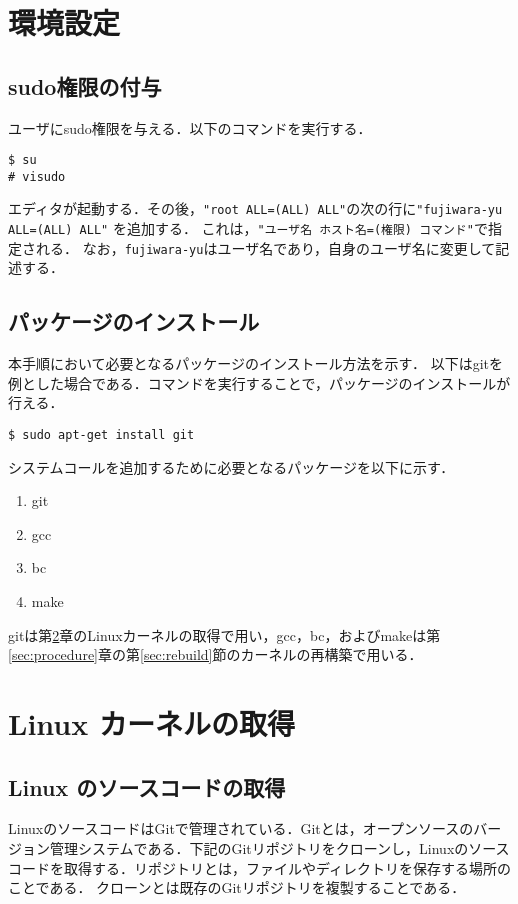 \documentclass[12pt]{jsarticle}
\begin{document}
\section{環境設定}\label{sec:config}
\subsection{sudo権限の付与}
ユーザにsudo権限を与える．以下のコマンドを実行する．
\begin{verbatim}
$ su
# visudo
\end{verbatim}
エディタが起動する．その後，\verb|"root ALL=(ALL) ALL"|の次の行に\verb|"fujiwara-yu ALL=(ALL) ALL"| を追加する．
これは，\verb|"ユーザ名 ホスト名=(権限) コマンド"|で指定される．
なお，\verb|fujiwara-yu|はユーザ名であり，自身のユーザ名に変更して記述する．

\subsection{パッケージのインストール}
本手順において必要となるパッケージのインストール方法を示す．
以下はgitを例とした場合である．コマンドを実行することで，パッケージのインストールが行える．
\begin{verbatim}
$ sudo apt-get install git
\end{verbatim}
システムコールを追加するために必要となるパッケージを以下に示す．
\begin{enumerate}
\item git
\item gcc
\item bc
\item make
\end{enumerate}

gitは第\ref{sec:kernel}章のLinuxカーネルの取得で用い，gcc，bc，およびmakeは第\ref{sec:procedure}章の第\ref{sec:rebuild}節のカーネルの再構築で用いる．

\section{Linux カーネルの取得}\label{sec:kernel}
\subsection{Linux のソースコードの取得}
LinuxのソースコードはGitで管理されている．Gitとは，オープンソースのバージョン管理システムである．下記のGitリポジトリをクローンし，Linuxのソースコードを取得する．リポジトリとは，ファイルやディレクトリを保存する場所のことである．
クローンとは既存のGitリポジトリを複製することである．
\end{document}
